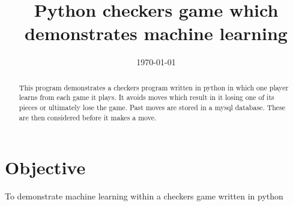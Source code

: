 \documentclass{article}
\title{Python checkers game which demonstrates machine learning} %
\date{\today} %
\begin{document}
\maketitle %

\begin{center}
\end{center}

 \begin{abstract}
 This program demonstrates a checkers program written in python in which one player learns from each game it plays. It avoids moves which result in it losing one of its pieces or ultimately lose the game. Past moves are stored in a mysql database. These are then considered before it makes a move.
 \end{abstract}


\section{Objective}
To demonstrate machine learning within a checkers game written in python%



\end{document}
